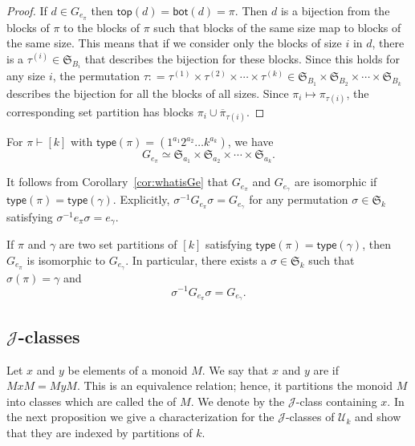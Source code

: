\begin{proof}
If $d\in G_{e_\pi}$ then $\mathsf{top}(d) = \mathsf{bot}(d) = \pi$. Then $d$ is a bijection from the
blocks of $\pi$ to the blocks of $\pi$ such that blocks of the same size map to blocks of the same size.  This means that if
we consider only the blocks of size $i$ in $d$, there is a $\tau^{(i)} \in \mathfrak{S}_{B_i}$ that describes the bijection for these blocks.
Since this holds for any size $i$, the permutation $\tau : = \tau^{(1)} \times \tau^{(2)}\times \cdots \times \tau^{(k)} \in \mathfrak{S}_{B_1}
\times \mathfrak{S}_{B_2}\times \cdots \times \mathfrak{S}_{B_k}$ describes the bijection for all the blocks of all sizes.  Since $\pi_i \mapsto \pi_{\tau(i)}$,
the corresponding set partition has blocks $\pi_i \cup \overline{\pi}_{\tau(i)}$.
\end{proof}

\begin{cor} \label{cor:whatisGe}
For $\pi \vdash [k]$ with $\mathsf{type}(\pi)= (1^{a_1}2^{a_2}\ldots k^{a_k})$, we have
\[
    G_{e_\pi} \simeq \mathfrak{S}_{a_1} \times \mathfrak{S}_{a_2} \times \cdots \times \mathfrak{S}_{a_k}.
\]
\end{cor}

It follows from Corollary~\ref{cor:whatisGe} that
$G_{e_\pi}$ and $G_{e_\gamma}$ are isomorphic if $\mathsf{type}(\pi)
= \mathsf{type}(\gamma)$. Explicitly, $\sigma^{-1} G_{e_\pi} \sigma
= G_{e_\gamma}$ for any permutation $\sigma \in \mathfrak{S}_k$
satisfying $\sigma^{-1} e_\pi \sigma = e_\gamma$.

\begin{cor}\label{cor:isomGe}
If $\pi$ and $\gamma$ are two set partitions of $[k]$ satisfying $\mathsf{type}(\pi) = \mathsf{type}(\gamma)$, then $G_{e_\pi}$
is isomorphic to $G_{e_\gamma}$. In particular, there exists a $\sigma \in \mathfrak{S}_k$ such that $\sigma(\pi) = \gamma$ and
\[
    \sigma^{-1} G_{e_\pi} \sigma = G_{e_\gamma}.
\]
\end{cor}

\subsection{$\mathscr{J}$-classes}
\label{section.J classes}

Let $x$ and $y$ be elements of a monoid $M$.  We say that $x$ and $y$ are  if $MxM = MyM$.
This is an equivalence relation; hence, it partitions the monoid $M$ into classes which are called the  of $M$. We denote by  the $\mathscr{J}$-class containing $x$.
In the next proposition we give a characterization for the $\mathscr{J}$-classes of $\mathcal{U}_k$ and show that they are indexed by partitions of $k$.

